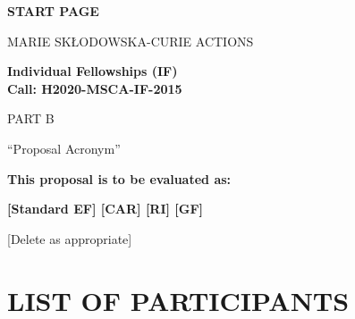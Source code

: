 \documentclass[a4paper,11pt]{article}
\newcommand{\acronym}{{\sc Proposal Acronym}\xspace\xspace}
\begin{document}
\phantom{a}
\vspace{15mm}
\begin{center}


        \Large{
      
     
        \textbf{START PAGE}
  
          \vspace{15mm}
          MARIE SKŁODOWSKA-CURIE ACTIONS\\
          \vspace{1cm}
          
          \textbf{Individual Fellowships (IF)}\\
          \textbf{Call: H2020-MSCA-IF-2015}
          \vspace{2cm}                   

          PART B
          \vspace{2.5cm}

          ``\acronym''
          \vspace{2cm}

          \textbf{This proposal is to be evaluated as:}
          \vspace{.5cm}

          \textbf{[Standard EF] [CAR] [RI] [GF]}\\
        }
        \large{[Delete as appropriate]}

  \end{center}
\vspace{1cm}

\newpage
\setcounter{tocdepth}{1}
\setcounter{section}{-1}
\tableofcontents


\newpage
\section{LIST OF PARTICIPANTS}
\label{sec:participants}

\newcommand\rotx[1]{\rotatebox[origin=c]{90}{\textbf{#1}}}
\newcommand\roty[1]{\rotatebox[origin=c]{90}{\parbox{4cm}{\raggedright\textbf{#1}}}}
\newcommand\MyHead[2]{\multicolumn{1}{l|}{\parbox{#1}{\centering #2}}}
\end{document}
